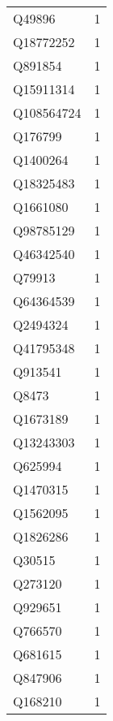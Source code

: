 \begin{tabular}{lr}
      Q49896 &                             1 \\
   Q18772252 &                             1 \\
     Q891854 &                             1 \\
   Q15911314 &                             1 \\
  Q108564724 &                             1 \\
     Q176799 &                             1 \\
    Q1400264 &                             1 \\
   Q18325483 &                             1 \\
    Q1661080 &                             1 \\
   Q98785129 &                             1 \\
   Q46342540 &                             1 \\
      Q79913 &                             1 \\
   Q64364539 &                             1 \\
    Q2494324 &                             1 \\
   Q41795348 &                             1 \\
     Q913541 &                             1 \\
       Q8473 &                             1 \\
    Q1673189 &                             1 \\
   Q13243303 &                             1 \\
     Q625994 &                             1 \\
    Q1470315 &                             1 \\
    Q1562095 &                             1 \\
    Q1826286 &                             1 \\
      Q30515 &                             1 \\
     Q273120 &                             1 \\
     Q929651 &                             1 \\
     Q766570 &                             1 \\
     Q681615 &                             1 \\
     Q847906 &                             1 \\
     Q168210 &                             1 \\

\end{tabular}
